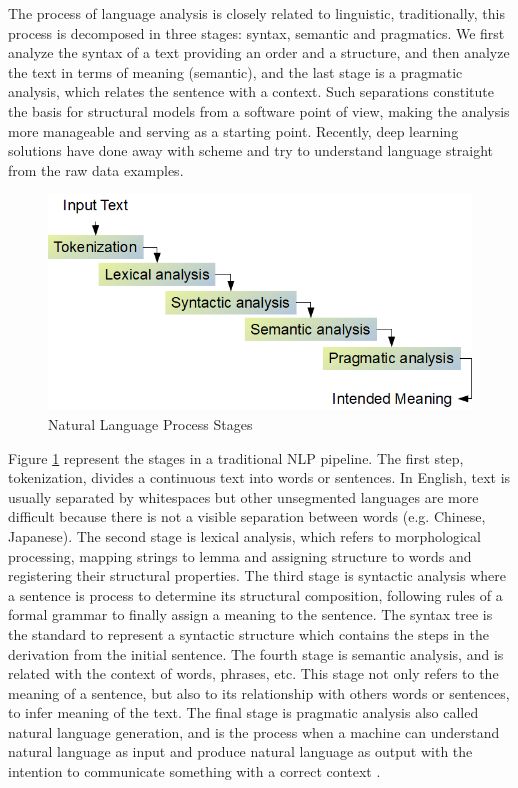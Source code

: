 \documentclass[12pt]{report}
\begin{document}
The process of language analysis is closely related to linguistic, traditionally, this process is decomposed in three stages: syntax, semantic and pragmatics. We first analyze the syntax of a text providing an order and a structure, and then  analyze  the text in terms of meaning (semantic), and the last stage is a pragmatic analysis, which relates the sentence with a context. Such separations constitute the basis for structural models from a software point of view, making the analysis more manageable and serving as a starting point. Recently, deep learning solutions have done away with scheme 
and try to understand language straight from the raw data examples. \cite{Indurkhya2010}

\begin{figure}[H]	
	\centering
	\includegraphics[width=150mm, scale = 1]{images/4_nlp.png}	
	\caption{Natural Language Process Stages}	
	\label{figure:NLP_Stages}
\end{figure}

Figure \ref{figure:NLP_Stages} represent the stages in a  traditional \ac{NLP} pipeline. The first step, tokenization,  divides a continuous text  into words or sentences. In English, text is usually separated by whitespaces but other unsegmented languages are more difficult because there is not a visible separation between words (e.g. Chinese, Japanese). The second stage is lexical analysis, which refers to morphological processing, mapping strings to lemma and assigning structure to words and registering their structural properties. The third stage is syntactic analysis where a sentence is process to determine its structural composition, following rules of a formal grammar to finally assign a meaning to the sentence. The syntax tree is the standard to represent a syntactic structure which contains the steps in the derivation from the initial sentence. The fourth stage is semantic analysis, and is related with the context of words, phrases, etc. This stage not only refers to the meaning of a sentence, but also to its relationship with others words or sentences, to infer meaning of the text. The final stage is pragmatic analysis also called natural language generation, and  is the process when a machine can understand natural language as input and produce natural language as output with the intention to communicate something with a correct context  \cite{ Indurkhya2010}.
\end{document}
